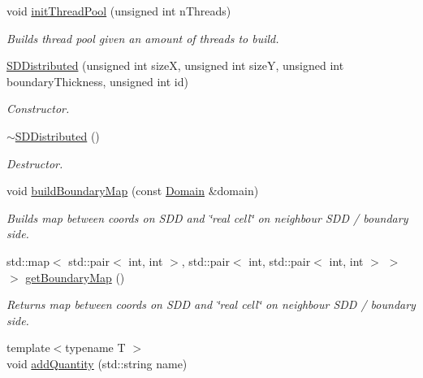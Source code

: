 \begin{DoxyCompactItemize}
void \hyperlink{classSDDistributed_a75660cf18d7248ac64e86ab457061b91}{init\+Thread\+Pool} (unsigned int n\+Threads)
\begin{DoxyCompactList}\small\item\em Builds thread pool given an amount of threads to build. \end{DoxyCompactList}\item 
\hyperlink{classSDDistributed_a49ef3cd6d1409cc71d3800fd0fca2f28}{S\+D\+Distributed} (unsigned int sizeX, unsigned int sizeY, unsigned int boundary\+Thickness, unsigned int id)
\begin{DoxyCompactList}\small\item\em Constructor. \end{DoxyCompactList}\item 
\mbox{\label{classSDDistributed_a1af9779279416a7bd519747e3b029124}} 
\hyperlink{classSDDistributed_a1af9779279416a7bd519747e3b029124}{$\sim$\+S\+D\+Distributed} ()
\begin{DoxyCompactList}\small\item\em Destructor. \end{DoxyCompactList}\item 
\mbox{\label{classSDDistributed_a995e6fad585afbf4158ea0b323eafc76}} 
void \hyperlink{classSDDistributed_a995e6fad585afbf4158ea0b323eafc76}{build\+Boundary\+Map} (const \hyperlink{classDomain}{Domain} \&domain)
\begin{DoxyCompactList}\small\item\em Builds map between coords on S\+DD and \char`\"{}real cell\char`\"{} on neighbour S\+DD / boundary side. \end{DoxyCompactList}\item 
\mbox{\label{classSDDistributed_a3617b83f6f2a6368b1f17c938d921e0a}} 
std\+::map$<$ std\+::pair$<$ int, int $>$, std\+::pair$<$ int, std\+::pair$<$ int, int $>$ $>$ $>$ \hyperlink{classSDDistributed_a3617b83f6f2a6368b1f17c938d921e0a}{get\+Boundary\+Map} ()
\begin{DoxyCompactList}\small\item\em Returns map between coords on S\+DD and \char`\"{}real cell\char`\"{} on neighbour S\+DD / boundary side. \end{DoxyCompactList}\item 
{\footnotesize template$<$typename T $>$ }\\void \hyperlink{classSDDistributed_a82b5a390e964051d1952c683b4fa5f05}{add\+Quantity} (std\+::string name)

\end{DoxyCompactItemize}

